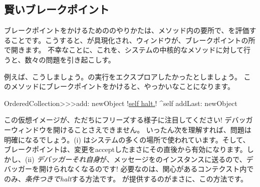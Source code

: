 \documentclass[a4paper,10pt,twoside]{book}
\begin{document}
\subsection{賢いブレークポイント}

ブレークポイントをかけるための\st{}のやりかたは、メソッド内の要所で、を評価することです。こうすると、が具現化され、ウィンドウが、ブレークポイントの所で開きます。
不幸なことに、これを、システムの中核的なメソッドに対して行うと、数々の問題を引き起こしす。

例えば、こうしましょう。の実行をエクスプロアしたかったとしましょう。
このメソッドにブレークポイントをかけると、やっかいなことになります。

\begin{code}{}
OrderedCollection>>>add: newObject
	!\underline{self halt.}!
	^self addLast: newObject
\end{code}

この仮想イメージが、ただちにフリーズする様子に注目してください! デバッガーウィンドウを開けることさえできません。
いったん次を理解すれば、問題は明確になるでしょう。(i) はシステムの多くの場所で使われています。そして、ブレークポイントは、変更をacceptしたまさにその直後から有効になります。しかし、(ii) \emph{デバッガーそれ自身}が、メッセージをのインスタンスに送るので、デバッガーを開けられなくなるのです!
必要なのは、関心があるコンテクスト内でのみ、\emph{条件つきでhalt}する方法です。
が提供するのがまさに、この方法です。
\end{document}
